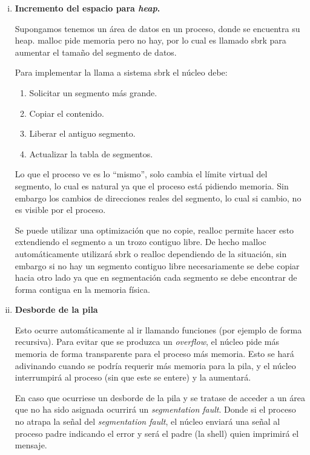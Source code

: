 \begin{enumerate}[i.]

\item \textbf{Incremento del espacio para \textit{heap}.}

Supongamos tenemos un área de datos en un proceso, donde se encuentra su heap.
malloc pide memoria pero no hay, por lo cual es llamado sbrk para aumentar el
tamaño del segmento de datos.

Para implementar la llama a sistema sbrk el núcleo debe:
\begin{enumerate}
	\item Solicitar un segmento más grande.
	\item Copiar el contenido.
	\item Liberar el antiguo segmento.
	\item Actualizar la tabla de segmentos.
\end{enumerate}

Lo que el proceso ve es lo ``mismo'', solo cambia el límite virtual del
segmento, lo cual es natural ya que el proceso está pidiendo memoria. Sin
embargo los cambios de direcciones reales del segmento, lo cual si cambio, no es
visible por el proceso.

Se puede utilizar una optimización que no copie, realloc permite hacer esto
extendiendo el segmento a un trozo contiguo libre. De hecho malloc
automáticamente utilizará sbrk o realloc dependiendo de la situación, sin
embargo si no hay un segmento contiguo libre necesariamente se debe copiar hacia
otro lado ya que en segmentación cada segmento se debe encontrar de forma
contigua en la memoria física.

\item \textbf{Desborde de la pila}

Esto ocurre automáticamente al ir llamando funciones (por ejemplo de forma
recursiva). Para evitar que se produzca un \textit{overflow}, el núcleo pide más
memoria de forma transparente para el proceso más memoria. Esto se hará
adivinando cuando se podría requerir más memoria para la pila, y el núcleo
interrumpirá al proceso (sin que este se entere) y la aumentará.

En caso que ocurriese un desborde de la pila y se tratase de acceder a un área
que no ha sido asignada ocurrirá un \textit{segmentation fault}. Donde si el
proceso no atrapa la señal del \textit{segmentation fault}, el núcleo enviará
una señal al proceso padre indicando el error y será el padre (la shell) quien
imprimirá el mensaje.


\end{enumerate}
